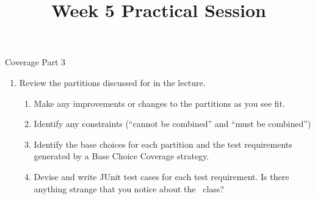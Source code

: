 



\title{Week 5 Practical Session}{Coverage Part 3}

\begin{enumerate}

    \item Review the partitions discussed for \triangleclass in the lecture.
    
    \begin{enumerate}
        \item Make any improvements or changes to the partitions as you see fit.
        
        \item Identify any constraints (``cannot be combined'' and ``must be combined'')
        
        \item Identify the base choices for each partition and the test
        requirements generated by a Base Choice Coverage strategy.

        \item Devise and write JUnit test cases for each test requirement. Is
        there anything strange that you notice about the \triangleclass~class?
    \end{enumerate}

\end{enumerate}

